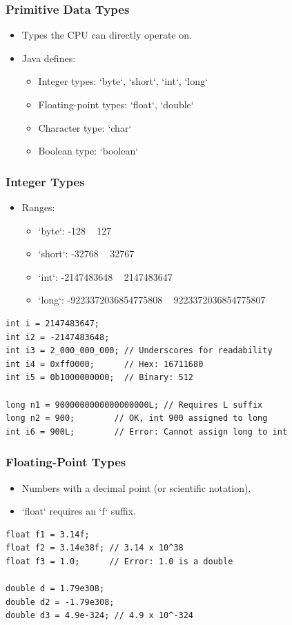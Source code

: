 \documentclass[serif, aspectratio=169]{beamer}
\begin{document}
\begin{frame}[fragile]
\frametitle{Primitive Data Types}
\begin{itemize}
    \item Types the CPU can directly operate on.
    \item Java defines:
    \begin{itemize}
        \item Integer types: `byte`, `short`, `int`, `long`
        \item Floating-point types: `float`, `double`
        \item Character type: `char`
        \item Boolean type: `boolean`
    \end{itemize}
\end{itemize}
\begin{center}
\end{center}
\end{frame}

\begin{frame}[fragile]
\frametitle{Integer Types}
\begin{itemize}
    \item Ranges:
    \begin{itemize}
        \item `byte`: -128 ~ 127
        \item `short`: -32768 ~ 32767
        \item `int`: -2147483648 ~ 2147483647
        \item `long`: -9223372036854775808 ~ 9223372036854775807
    \end{itemize}
\end{itemize}
\begin{lstlisting}
int i = 2147483647;
int i2 = -2147483648;
int i3 = 2_000_000_000; // Underscores for readability
int i4 = 0xff0000;      // Hex: 16711680
int i5 = 0b1000000000;  // Binary: 512

long n1 = 9000000000000000000L; // Requires L suffix
long n2 = 900;        // OK, int 900 assigned to long
int i6 = 900L;        // Error: Cannot assign long to int
\end{lstlisting}
\end{frame}

\begin{frame}[fragile]
\frametitle{Floating-Point Types}
\begin{itemize}
    \item Numbers with a decimal point (or scientific notation).
    \item `float` requires an `f` suffix.
\end{itemize}
\begin{lstlisting}
float f1 = 3.14f;
float f2 = 3.14e38f; // 3.14 x 10^38
float f3 = 1.0;      // Error: 1.0 is a double

double d = 1.79e308;
double d2 = -1.79e308;
double d3 = 4.9e-324; // 4.9 x 10^-324
\end{lstlisting}
\end{frame}
\end{document}
